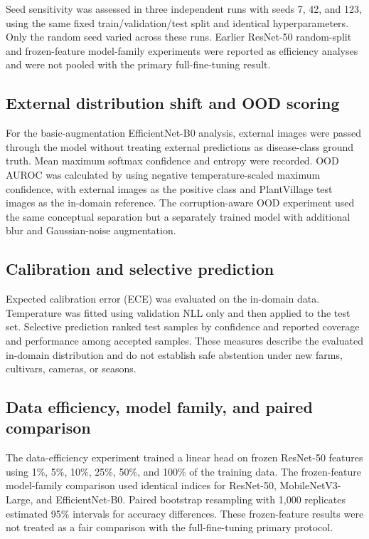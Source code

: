 \documentclass[12pt]{article}
\begin{document}
Seed sensitivity was assessed in three independent runs with seeds 7, 42, and 123, using the same fixed train/validation/test split and identical hyperparameters. Only the random seed varied across these runs. Earlier ResNet-50 random-split and frozen-feature model-family experiments were reported as efficiency analyses and were not pooled with the primary full-fine-tuning result.

\subsection{External distribution shift and OOD scoring}
For the basic-augmentation EfficientNet-B0 analysis, external images were passed through the model without treating external predictions as disease-class ground truth. Mean maximum softmax confidence and entropy were recorded. OOD AUROC was calculated by using negative temperature-scaled maximum confidence, with external images as the positive class and PlantVillage test images as the in-domain reference. The corruption-aware OOD experiment used the same conceptual separation but a separately trained model with additional blur and Gaussian-noise augmentation.

\subsection{Calibration and selective prediction}
Expected calibration error (ECE) was evaluated on the in-domain data. Temperature was fitted using validation NLL only and then applied to the test set. Selective prediction ranked test samples by confidence and reported coverage and performance among accepted samples. These measures describe the evaluated in-domain distribution and do not establish safe abstention under new farms, cultivars, cameras, or seasons.

\subsection{Data efficiency, model family, and paired comparison}
The data-efficiency experiment trained a linear head on frozen ResNet-50 features using 1\%, 5\%, 10\%, 25\%, 50\%, and 100\% of the training data. The frozen-feature model-family comparison used identical indices for ResNet-50, MobileNetV3-Large, and EfficientNet-B0. Paired bootstrap resampling with 1,000 replicates estimated 95\% intervals for accuracy differences. These frozen-feature results were not treated as a fair comparison with the full-fine-tuning primary protocol.
\end{document}
